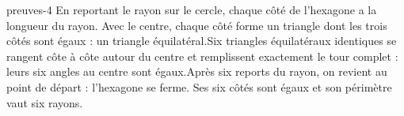 \begin{blocEdition}{preuves-4}
En reportant le rayon sur le cercle, chaque côté de l’hexagone a la longueur du rayon. Avec le centre, chaque côté forme un triangle dont les trois côtés sont égaux : un triangle équilatéral.Six triangles équilatéraux identiques se rangent côte à côte autour du centre et remplissent exactement le tour complet : leurs six angles au centre sont égaux.Après six reports du rayon, on revient au point de départ : l’hexagone se ferme. Ses six côtés sont égaux et son périmètre vaut six rayons.
\end{blocEdition}
